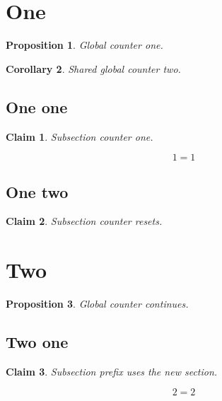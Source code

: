 \documentclass{article}
\newtheorem{proposition}{Proposition}
\newtheorem{corollary}[proposition]{Corollary}
\newtheorem{claim}{Claim}[subsection]
\numberwithin{equation}{section}
\begin{document}
\section{One}\label{sec:one}
\begin{proposition}\label{prop:one}
Global counter one.
\end{proposition}
\begin{corollary}\label{cor:one}
Shared global counter two.
\end{corollary}

\subsection{One one}\label{subsec:one-one}
\begin{claim}\label{claim:one-one}
Subsection counter one.
\end{claim}
\begin{equation}\label{eq:one}
  1 = 1
\end{equation}

\subsection{One two}\label{subsec:one-two}
\begin{claim}\label{claim:one-two}
Subsection counter resets.
\end{claim}

\section{Two}\label{sec:two}
\begin{proposition}\label{prop:two}
Global counter continues.
\end{proposition}
\subsection{Two one}\label{subsec:two-one}
\begin{claim}\label{claim:two-one}
Subsection prefix uses the new section.
\end{claim}
\begin{equation}\label{eq:two}
  2 = 2
\end{equation}
\end{document}

